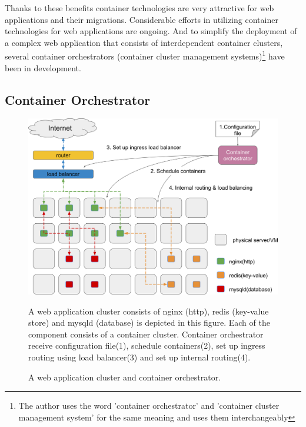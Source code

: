 Thanks to these benefits container technologies are very attractive for web applications and their migrations.
Considerable efforts in utilizing container technologies for web applications are ongoing.
And to simplify the deployment of a complex web application that consists of interdependent container clusters, several container orchestrators (container cluster management systems)\footnote{The author uses the word 'container orchestrator' and 'container cluster management system' for the same meaning and uses them interchangeably} have been in development.

\subsection{Container Orchestrator}

\begin{figure}[h]
\begin{center}
\includegraphics[width=0.9\columnwidth]{Figs/container_management_system}
\end{center}
\caption{
A web application cluster and container orchestrator.
}
\centering\parbox[c]{0.9\columnwidth}{
A web application cluster consists of nginx (http), redis (key-value store) and mysqld (database) is depicted in this figure. 
Each of the component consists of a container cluster.
Container orchestrator receive configuration file(1), schedule containers(2), set up ingress routing using load balancer(3) and set up internal routing(4).
}
\label{fig:container_management_system}
\end{figure}

